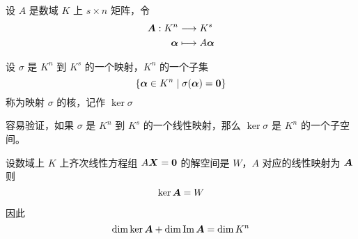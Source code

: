 设 $A$ 是数域 $K$ 上 $s\times n$ 矩阵，令
\begin{equation*}
    \begin{aligned}
        \boldsymbol{A} : K^n &\longrightarrow K^s\\
        \boldsymbol{\alpha} &\longmapsto A\boldsymbol{\alpha}
    \end{aligned}
\end{equation*}


\begin{definition}
    设 $\sigma$ 是 $K^n$ 到 $K^s$ 的一个映射，$K^n$ 的一个子集
    $$\{\boldsymbol{\alpha} \in K^n \mid \sigma(\boldsymbol{\alpha}) = \boldsymbol{0}\}$$
    称为映射 $\sigma$ 的核，记作 $\ker \sigma$
\end{definition}

容易验证，如果 $\sigma$ 是 $K^n$ 到 $K^s$ 的一个线性映射，那么 $\ker \sigma$ 是 $K^n$ 的一个子空间。

\begin{theorem}
    设数域上 $K$ 上齐次线性方程组 $A\boldsymbol{X} = \boldsymbol{0}$ 的解空间是 $W$，$A$ 对应的线性映射为 $\boldsymbol{A}$ 则
    $$\ker \boldsymbol{A} = W$$
\end{theorem}

因此
$$\dim \ker \boldsymbol{A} + \dim \operatorname{Im} \boldsymbol{A} = \dim K^n$$
